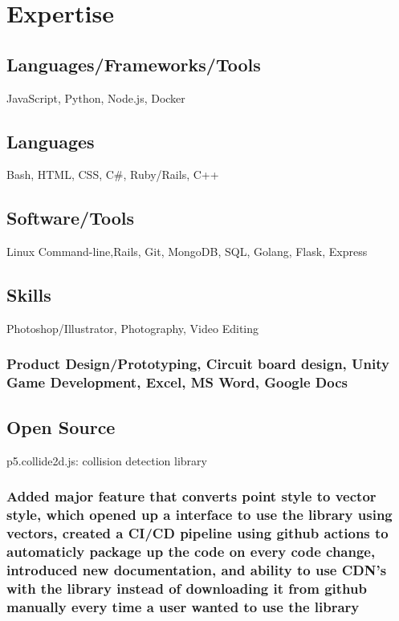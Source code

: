 \documentclass{article}
\begin{document}
\section{Expertise}
		\subsection{Languages/Frameworks/Tools}
		JavaScript, Python, Node.js, Docker
		\subsection{Languages}
		Bash, HTML, CSS,  C\#, Ruby/Rails, C++
		\vspace{-2mm}
		
		\subsection{Software/Tools}
		Linux Command-line,Rails, Git, MongoDB, SQL, Golang, Flask, Express
		\vspace{-3mm}
		\subsection{Skills}Photoshop/Illustrator, Photography, Video Editing
		\vspace{-3mm}
		\subsubsection{Product Design/Prototyping, Circuit board design,  Unity Game Development, Excel, MS Word, Google Docs}
		\vspace{-3mm}

    	\subsection{Open Source} p5.collide2d.js: collision detection library
		\subsubsection{Added major feature that converts point style to vector style, which opened up a interface to use the library using vectors, created a CI/CD pipeline using github actions to automaticly package up the code on every code change, introduced new documentation, and ability to use CDN's with the library instead of downloading it from github manually every time a user wanted to use the library }
		\vspace{-3mm}
			
\end{document}

